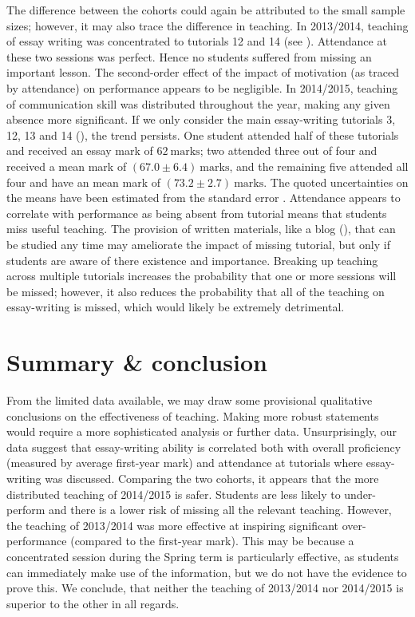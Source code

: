 The difference between the cohorts could again be attributed to the small sample sizes; however, it may also trace the difference in teaching. In 2013/2014, teaching of essay writing was concentrated to tutorials 12 and 14 (see ). Attendance at these two sessions was perfect. Hence no students suffered from missing an important lesson. The second-order effect of the impact of motivation (as traced by attendance) on performance appears to be negligible. In 2014/2015, teaching of communication skill was distributed throughout the year, making any given absence more significant. If we only consider the main essay-writing tutorials 3, 12, 13 and 14 (), the trend persists.  One student attended half of these tutorials and received an essay mark of $62~\mathrm{marks}$; two attended three out of four and received a mean mark of $(67.0\pm6.4)~\mathrm{marks}$, and the remaining five attended all four and have an mean mark of $(73.2\pm2.7)~\mathrm{marks}$. The quoted uncertainties on the means have been estimated from the standard error \citep[chapter 22]{Mackay2003}. Attendance appears to correlate with performance as being absent from tutorial means that students miss useful teaching. The provision of written materials, like a blog (), that can be studied any time may ameliorate the impact of missing tutorial, but only if students are aware of there existence and importance. Breaking up teaching across multiple tutorials increases the probability that one or more sessions will be missed; however, it also reduces the probability that all of the teaching on essay-writing is missed, which would likely be extremely detrimental.

\section{Summary \& conclusion}\label{sec:marks-end}

From the limited data available, we may draw some provisional qualitative conclusions on the effectiveness of teaching. Making more robust statements would require a more sophisticated analysis or further data. Unsurprisingly, our data suggest that essay-writing ability is correlated both with overall proficiency (measured by average first-year mark) and attendance at tutorials where essay-writing was discussed. Comparing the two cohorts, it appears that the more distributed teaching of 2014/2015 is safer. Students are less likely to under-perform and there is a lower risk of missing all the relevant teaching. However, the teaching of 2013/2014 was more effective at inspiring significant over-performance (compared to the first-year mark). This may be because a concentrated session during the Spring term is particularly effective, as students can immediately make use of the information, but we do not have the evidence to prove this. We conclude, that neither the teaching of 2013/2014 nor 2014/2015 is superior to the other in all regards.

